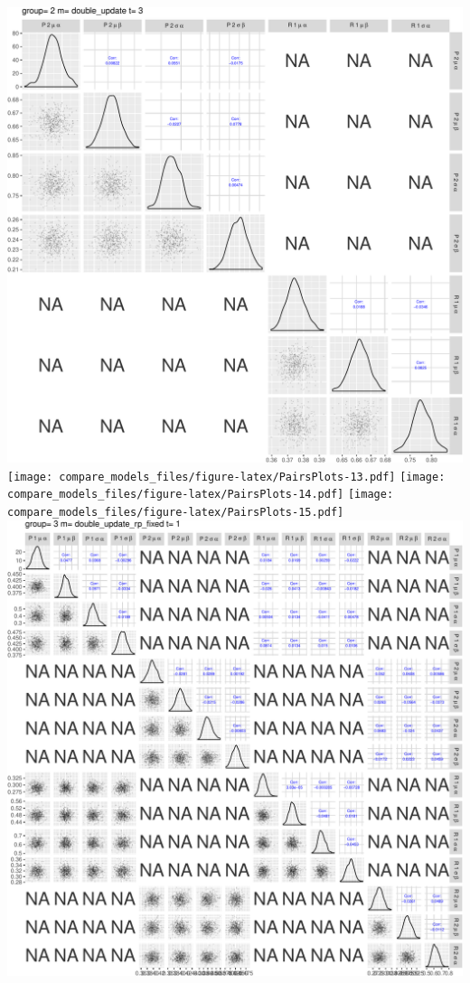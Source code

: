 \documentclass[]{article}
\begin{document}
\includegraphics{compare_models_files/figure-latex/PairsPlots-12.pdf}
\texttt{[image: compare\_models\_files/figure-latex/PairsPlots-13.pdf]}
\texttt{[image: compare\_models\_files/figure-latex/PairsPlots-14.pdf]}
\texttt{[image: compare\_models\_files/figure-latex/PairsPlots-15.pdf]}
\includegraphics{compare_models_files/figure-latex/PairsPlots-16.pdf}
\end{document}
